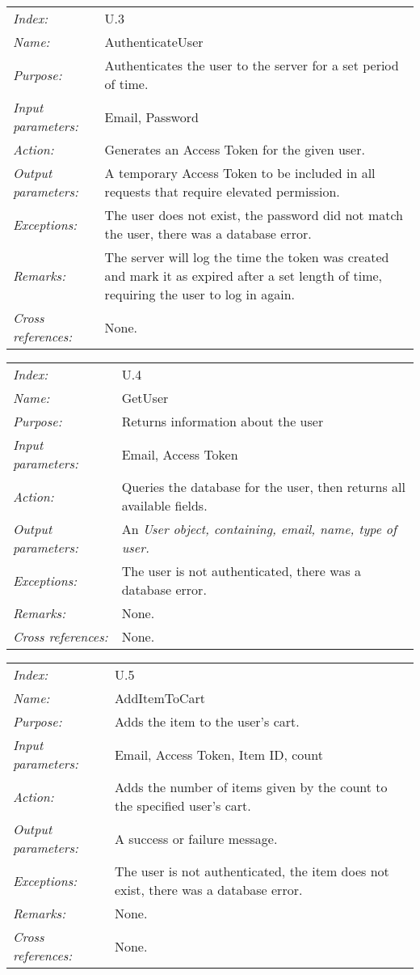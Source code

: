 \documentclass[10pt,letter]{article}
\begin{document}
\begin{tabularx}{\textwidth}{l X}
    \it{Index:} & U.3 \\
    \it{Name:} & AuthenticateUser \\
    \it{Purpose:} & Authenticates the user to the server for a set period of time. \\
    \it{Input parameters:} & Email, Password \\
    \it{Action:} & Generates an Access Token for the given user. \\
    \it{Output parameters:} & A temporary Access Token to be included in all requests that require elevated permission. \\
    \it{Exceptions:} & The user does not exist, the password did not match the user, there was a database error. \\
    \it{Remarks:} & The server will log the time the token was created and mark it as expired after a set length of time, 
    requiring the user to log in again. \\
    \it{Cross references:} & None. \\
    \hline
\end{tabularx}

\begin{tabularx}{\textwidth}{l X}
    \it{Index:} & U.4 \\
    \it{Name:} & GetUser \\
    \it{Purpose:} & Returns information about the user \\
    \it{Input parameters:} & Email, Access Token \\
    \it{Action:} & Queries the database for the user, then returns all available fields. \\
    \it{Output parameters:} &  An \it{User} object, containing, email, name, type of user.\\
    \it{Exceptions:} & The user is not authenticated, there was a database error. \\
    \it{Remarks:} & None. \\
    \it{Cross references:} & None. \\
    \hline
\end{tabularx}

\begin{tabularx}{\textwidth}{l X}
    \it{Index:} & U.5 \\
    \it{Name:} & AddItemToCart \\
    \it{Purpose:} & Adds the item to the user's cart. \\
    \it{Input parameters:} & Email, Access Token, Item ID, count \\
    \it{Action:} & Adds the number of items given by the count to the specified user's cart. \\
    \it{Output parameters:} & A success or failure message. \\
    \it{Exceptions:} & The user is not authenticated, the item does not exist, there was a database error. \\
    \it{Remarks:} & None. \\
    \it{Cross references:} & None. \\
    \hline
\end{tabularx}
\end{document}
